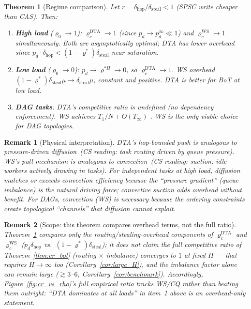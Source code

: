 \documentclass[11pt,a4paper]{article}
\newtheorem{theorem}{Theorem}[section]
\newtheorem{remark}{Remark}[section]
\newcommand{\physics}[2]{#1\ \textnormal{(\emph{CS reading}: #2)}}
\begin{document}
\begin{theorem}[Regime comparison]\label{thm:regime_compare}
Let $r = \delta_{\mathrm{hop}}/\delta_{\mathrm{steal}} < 1$ (SPSC write cheaper
than CAS).  Then:
\begin{enumerate}
  \item \textbf{High load} ($\varrho_0 \to 1$):
        $\varrho_c^{\mathrm{DTA}} \to 1$ (since $p_d \to p_d^{\infty} \ll 1$)
        and $\varrho_c^{\mathrm{WS}} \to 1$ simultaneously.
        Both are asymptotically optimal; DTA has lower overhead since
        $p_d \cdot \delta_{\mathrm{hop}} < (1-\varrho^*)\delta_{\mathrm{steal}}$
        near saturation.

  \item \textbf{Low load} ($\varrho_0 \to 0$):
        $p_d \to \varrho^{*H} \to 0$, so $\varrho_c^{\mathrm{DTA}} \to 1$.
        WS overhead $(1-\varrho^*)\delta_{\mathrm{steal}}\mu \to \delta_{\mathrm{steal}}\mu$,
        constant and positive.  DTA is better for BoT at low load.

  \item \textbf{DAG tasks}:
        DTA's competitive ratio is undefined (no dependency enforcement).
        WS achieves $T_1/N + O(T_\infty)$ \cite{blumofe1999}.
        WS is the only viable choice for DAG topologies.
\end{enumerate}
\end{theorem}

\begin{remark}[Physical interpretation]
DTA's hop-bounded push is analogous to
\physics{pressure-driven diffusion}{task routing driven by queue pressure}.
WS's pull mechanism is analogous to
\physics{convection}{suction: idle workers actively drawing in tasks}.
For independent tasks at high load, diffusion matches or exceeds convection
efficiency because the ``pressure gradient'' (queue imbalance) is the natural
driving force; convective suction adds overhead without benefit.
For DAGs, convection (WS) is necessary because the ordering constraints
create topological ``channels'' that diffusion cannot exploit.
\end{remark}

\begin{remark}[Scope: this theorem compares overhead terms, not the full ratio]
\label{rem:regime_compare_scope}
Theorem~\ref{thm:regime_compare} compares only the \emph{routing/stealing-overhead}
components of $\varrho_c^{\mathrm{DTA}}$ and $\varrho_c^{\mathrm{WS}}$
($p_d\delta_{\mathrm{hop}}$ vs.\ $(1-\varrho^*)\delta_{\mathrm{steal}}$); it does
not claim the \emph{full} competitive ratio of Theorem~\ref{thm:cr_bot}
(routing $\times$ imbalance) converges to $1$ at fixed $H$ --- that requires
$H\to\infty$ too (Corollary~\ref{cor:large_H}), and the imbalance factor alone
can remain large ($\gtrsim3$--$6$, Corollary~\ref{cor:benchmark}). Accordingly,
Figure~\ref{fig:cr_vs_rho}'s full empirical ratio tracks WS/CQ rather than
beating them outright: ``DTA dominates at all loads'' in item~1 above is an
overhead-only statement.
\end{remark}
\end{document}
